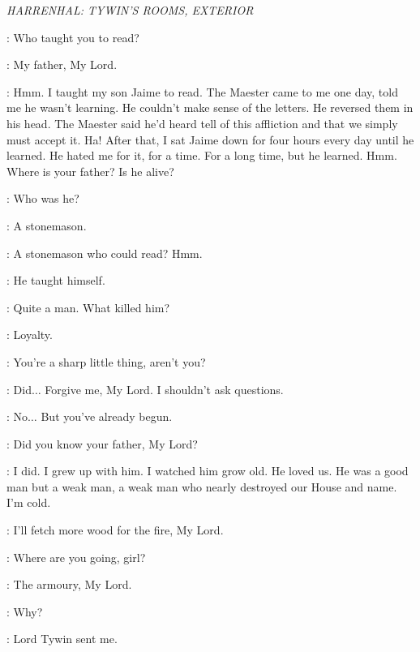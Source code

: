 \scene

\textit{HARRENHAL: TYWIN'S ROOMS, EXTERIOR} 


\TYWIN: Who taught you to read? 

\ARYA: My father, My Lord. 

\TYWIN: Hmm. I taught my son Jaime to read. The Maester came to me one day, told me he wasn't learning. He couldn't make sense of the letters. He reversed them in his head. The Maester said he'd heard tell of this affliction and that we simply must accept it. Ha! After that, I sat Jaime down for four hours every day until he learned. He hated me for it, for a time. For a long time, but he learned. Hmm. Where is your father? Is he alive? 


\TYWIN: Who was he? 

\ARYA: A stonemason. 

\TYWIN: A stonemason who could read? Hmm. 

\ARYA: He taught himself. 

\TYWIN: Quite a man. What killed him? 

\ARYA: Loyalty. 

\TYWIN: You're a sharp little thing, aren't you? 

\ARYA: Did$\ldots$ Forgive me, My Lord. I shouldn't ask questions. 

\TYWIN: No$\ldots$ But you've already begun. 

\ARYA: Did you know your father, My Lord? 

\TYWIN: I did. I grew up with him. I watched him grow old. He loved us. He was a good man  but a weak man, a weak man who nearly destroyed our House and name. I'm cold. 

\ARYA: I'll fetch more wood for the fire, My Lord. 


\AMORY: Where are you going, girl? 

\ARYA: The armoury, My Lord. 

\AMORY: Why? 

\ARYA: Lord Tywin sent me. 


